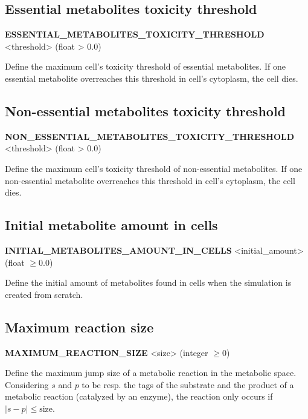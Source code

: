 
\subsection{Essential metabolites toxicity threshold}
\begin{center}
{\bf ESSENTIAL\_METABOLITES\_TOXICITY\_THRESHOLD} <threshold> (float > 0.0)
\end{center}
Define the maximum cell's toxicity threshold of essential metabolites. If one essential metabolite overreaches this threshold in cell's cytoplasm, the cell dies. 


\subsection{Non-essential metabolites toxicity threshold}
\begin{center}
{\bf NON\_ESSENTIAL\_METABOLITES\_TOXICITY\_THRESHOLD} <threshold> (float > 0.0)
\end{center}
Define the maximum cell's toxicity threshold of non-essential metabolites. If one non-essential metabolite overreaches this threshold in cell's cytoplasm, the cell dies. 


\subsection{Initial metabolite amount in cells}
\begin{center}
{\bf INITIAL\_METABOLITES\_AMOUNT\_IN\_CELLS} <initial\_amount> (float $\ge 0.0$)
\end{center}
Define the initial amount of metabolites found in cells when the simulation is created from scratch.


\subsection{Maximum reaction size}
\begin{center}
{\bf MAXIMUM\_REACTION\_SIZE} <size> (integer $\ge 0$)
\end{center}
Define the maximum jump size of a metabolic reaction in the metabolic space. Considering $s$ and $p$ to be resp. the tags of the substrate and the product of a metabolic reaction (catalyzed by an enzyme), the reaction only occurs if $|s-p| \le \mbox{size}$.

